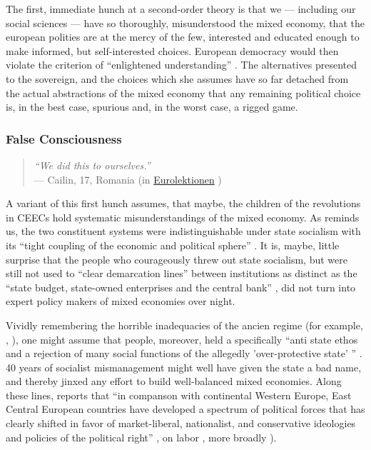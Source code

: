 The first, immediate hunch at a second-order theory is that we --- including our social sciences --- have so thoroughly, misunderstood the mixed economy, that the european polities are at the mercy of the few, interested and educated enough to make informed, but self-interested choices.
European democracy would then violate the criterion of ``enlightened understanding'' \citep{Dahl-1989-aa}.
The alternatives presented to the sovereign, and the choices which she assumes have so far detached from the actual abstractions of the mixed economy that any remaining political choice is, in the best case, spurious and, in the worst case, a rigged game.

\subsubsection[False Consciousness]{False Consciousness}

\begin{quote}
	\emph{``We did this to ourselves.''}\\
	--- Cailin, 17, Romania (in \href{http://eurolektionen.de}{Eurolektionen} \citeyear{DeRuffray2010})
\end{quote}

A variant of this first hunch assumes, that maybe, the children of the revolutions in \glspl{CEEC} hold systematic misunderstandings of the mixed economy.
As \citeauthor{Bonker2006} reminds us, the two constituent systems were indistinguishable under state socialism with its ``tight coupling of the economic and political sphere'' \citeyearpar[35]{Bonker2006}.
It is, maybe, little surprise that the people who courageously threw out state socialism, but were still not used to ``clear demarcation lines'' between institutions as distinct as the ``state budget, state-owned enterprises and the central bank'' \citeyearpar[36]{Bonker2006}, did not turn into expert policy makers of mixed economies over night.

Vividly remembering the horrible inadequacies of the ancien regime (for example, \citealt{Szikra2009}, \citealt{Millard1992}), one might assume that people, moreover, held a specifically  ``anti state ethos and a rejection of many social functions of the allegedly 'over-protective state' '' \citeyearpar[130]{Millard1992}.
40 years of socialist mismanagement might well have given the state a bad name, and thereby jinxed any effort to build well-balanced mixed economies.
Along these lines, \citeauthor{Inglot2008} reports that ``in companson with continental Western Europe, East Central European countries have developed a spectrum of political forces that has clearly shifted in favor of market-liberal, nationalist, and conservative ideologies and policies of the political right'' \citeyearpar[212]{Inglot2008}, on labor \citealt{Crowley2002}, more broadly \citealt{OrenOuto2001}).

